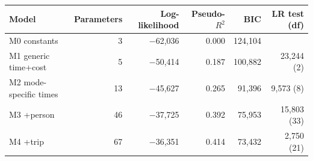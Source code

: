 \begin{tabular}{lrrrrr}
\toprule
Model & Parameters & Log-likelihood & Pseudo-$R^2$ & BIC & LR test (df) \\
\midrule
M0 constants & 3 & $-$62,036 & 0.000 & 124,104 &  \\
M1 generic time+cost & 5 & $-$50,414 & 0.187 & 100,882 & 23,244 (2) \\
M2 mode-specific times & 13 & $-$45,627 & 0.265 & 91,396 & 9,573 (8) \\
M3 +person & 46 & $-$37,725 & 0.392 & 75,953 & 15,803 (33) \\
M4 +trip & 67 & $-$36,351 & 0.414 & 73,432 & 2,750 (21) \\
\bottomrule
\end{tabular}
